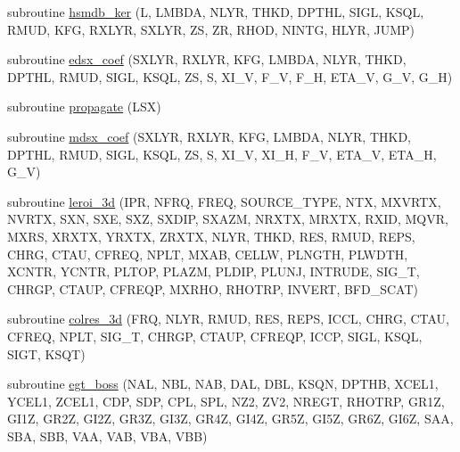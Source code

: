 \begin{DoxyCompactItemize}
\item 
subroutine \hyperlink{Leroi_8f90_aa06a6e2460dd29bc7e4cd0f7378aa005}{hsmdb\+\_\+ker} (L, L\+M\+B\+DA, N\+L\+YR, T\+H\+KD, D\+P\+T\+HL, S\+I\+GL, K\+S\+QL, R\+M\+UD, K\+FG, R\+X\+L\+YR, S\+X\+L\+YR, ZS, ZR, R\+H\+OD, N\+I\+N\+TG, H\+L\+YR, J\+U\+MP)
\item 
subroutine \hyperlink{Leroi_8f90_a2ffa10f72b064e2c52fb28da1b335098}{edsx\+\_\+coef} (S\+X\+L\+YR, R\+X\+L\+YR, K\+FG, L\+M\+B\+DA, N\+L\+YR, T\+H\+KD, D\+P\+T\+HL, R\+M\+UD, S\+I\+GL, K\+S\+QL, ZS, S, X\+I\+\_\+V, F\+\_\+V, F\+\_\+H, E\+T\+A\+\_\+V, G\+\_\+V, G\+\_\+H)
\item 
subroutine \hyperlink{Leroi_8f90_a58ae4aba68186ebcf3cfb74fa1361584}{propagate} (L\+SX)
\item 
subroutine \hyperlink{Leroi_8f90_a37f7ce2aa039b27d2452e812479745a7}{mdsx\+\_\+coef} (S\+X\+L\+YR, R\+X\+L\+YR, K\+FG, L\+M\+B\+DA, N\+L\+YR, T\+H\+KD, D\+P\+T\+HL, R\+M\+UD, S\+I\+GL, K\+S\+QL, ZS, S, X\+I\+\_\+V, X\+I\+\_\+H, F\+\_\+V, E\+T\+A\+\_\+V, E\+T\+A\+\_\+H, G\+\_\+V)
\item 
subroutine \hyperlink{Leroi_8f90_ad3c98b0aa8032dd5e2c3fce9417d4512}{leroi\+\_\+3d} (I\+PR, N\+F\+RQ, F\+R\+EQ, S\+O\+U\+R\+C\+E\+\_\+\+T\+Y\+PE, N\+TX, M\+X\+V\+R\+TX, N\+V\+R\+TX, S\+XN, S\+XE, S\+XZ, S\+X\+D\+IP, S\+X\+A\+ZM, N\+R\+X\+TX, M\+R\+X\+TX, R\+X\+ID, M\+Q\+VR, M\+X\+RS, X\+R\+X\+TX, Y\+R\+X\+TX, Z\+R\+X\+TX, N\+L\+YR, T\+H\+KD, R\+ES, R\+M\+UD, R\+E\+PS, C\+H\+RG, C\+T\+AU, C\+F\+R\+EQ, N\+P\+LT, M\+X\+AB, C\+E\+L\+LW, P\+L\+N\+G\+TH, P\+L\+W\+D\+TH, X\+C\+N\+TR, Y\+C\+N\+TR, P\+L\+T\+OP, P\+L\+A\+ZM, P\+L\+D\+IP, P\+L\+U\+NJ, I\+N\+T\+R\+U\+DE, S\+I\+G\+\_\+T, C\+H\+R\+GP, C\+T\+A\+UP, C\+F\+R\+E\+QP, M\+X\+R\+HO, R\+H\+O\+T\+RP, I\+N\+V\+E\+RT, B\+F\+D\+\_\+\+S\+C\+AT)
\item 
subroutine \hyperlink{Leroi_8f90_a61eed94d3789d0474014a2cd34a792c6}{colres\+\_\+3d} (F\+RQ, N\+L\+YR, R\+M\+UD, R\+ES, R\+E\+PS, I\+C\+CL, C\+H\+RG, C\+T\+AU, C\+F\+R\+EQ, N\+P\+LT, S\+I\+G\+\_\+T, C\+H\+R\+GP, C\+T\+A\+UP, C\+F\+R\+E\+QP, I\+C\+CP, S\+I\+GL, K\+S\+QL, S\+I\+GT, K\+S\+QT)
\item 
subroutine \hyperlink{Leroi_8f90_a1b3954d66e2114dd2d6b6a5a44b7f0a4}{egt\+\_\+boss} (N\+AL, N\+BL, N\+AB, D\+AL, D\+BL, K\+S\+QN, D\+P\+T\+HB, X\+C\+E\+L1, Y\+C\+E\+L1, Z\+C\+E\+L1, C\+DP, S\+DP, C\+PL, S\+PL, N\+Z2, Z\+V2, N\+R\+E\+GT, R\+H\+O\+T\+RP, G\+R1Z, G\+I1Z, G\+R2Z, G\+I2Z, G\+R3Z, G\+I3Z, G\+R4Z, G\+I4Z, G\+R5Z, G\+I5Z, G\+R6Z, G\+I6Z, S\+AA, S\+BA, S\+BB, V\+AA, V\+AB, V\+BA, V\+BB)
\item 

\end{DoxyCompactItemize}
